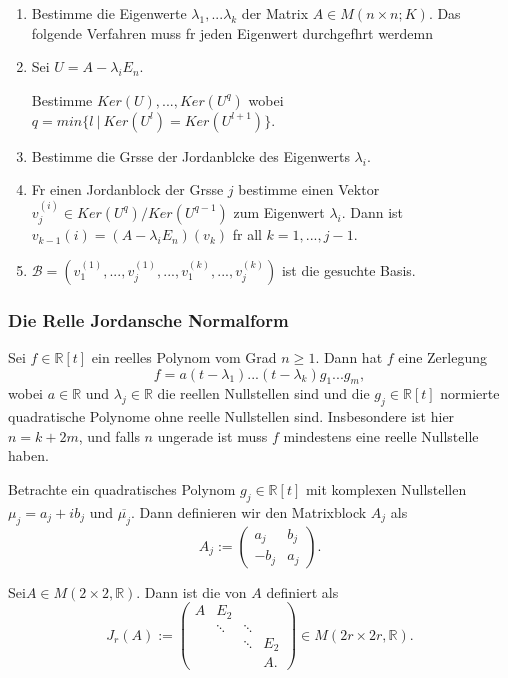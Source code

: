 \documentclass[9pt, a4paper, twocolumn, landscape]{article}
\begin{document}
\begin{remark}
\begin{enumerate}
\item Bestimme die Eigenwerte $\lambda_1, ... \lambda_k$ der Matrix $A \in M(n \times n; K)$. Das folgende Verfahren muss f\uee r jeden Eigenwert durchgef\uee hrt werdemn
\item Sei $U = A - \lambda_i E_n$.

Bestimme $Ker(U), ..., Ker(U^q)$ wobei $q= min\{l \ | \ Ker(U^l) = Ker(U^{l+1})\}$. 
\item Bestimme die Gr\oee sse der Jordanbl\oee cke des Eigenwerts $\lambda_i$.
\item F\uee r einen Jordanblock der Gr\oee sse $j$ bestimme einen Vektor $v_j^{(i)} \in Ker(U^q) / Ker(U^{q-1})$ zum Eigenwert $\lambda_i$. Dann ist $v_{k-1}{(i)} = (A - \lambda_i E_n)(v_k) $ f\uee r all $k = 1, ..., j-1.$
\item $\mathcal{B} = (v_1^{(1)}, ..., v_j^{(1)}, ..., v_1^{(k)}, ..., v_j^{(k)})$ ist die gesuchte Basis.

\end{enumerate}
\end{remark}




\subsubsection{Die Relle Jordansche Normalform}
\begin{theorem}
Sei $f \in \mathbb{R}[t]$ ein reelles Polynom vom Grad $n \geq 1$. Dann hat $f$ eine Zerlegung
$$
f = a(t - \lambda_1)...(t- \lambda_k)g_1...g_m,
$$
wobei $a \in \mathbb{R}$ und $\lambda_j \in \mathbb{R}$ die reellen Nullstellen sind und die $g_j \in \mathbb{R}[t]$ normierte quadratische Polynome ohne reelle Nullstellen sind. Insbesondere ist hier $n = k + 2m$, und falls $n$ ungerade ist muss $f$ mindestens eine reelle Nullstelle haben.
\end{theorem}


\begin{definition}
Betrachte ein quadratisches Polynom $g_j \in \mathbb{R}[t]$ mit komplexen Nullstellen $\mu_j = a_j + i b_j$ und $\overline{\mu_j}$. Dann definieren wir den Matrixblock $A_j$ als
$$
A_j := \left( \begin{array}{cc}
a_j & b_j \\ -b_j & a_j
\end{array} \right).
$$

Sei$A \in M( 2 \times 2, \mathbb{R})$. Dann ist die  von $A$ definiert als
$$
J_r(A) := \left( \begin{array}{cccc}
A & E_2 & & \\ & \ddots & \ddots & \\ & & \ddots & E_2 \\ & & & A.
\end{array} \right) \in M( 2r \times 2r, \mathbb{R}).
$$

\end{definition}
\end{document}
